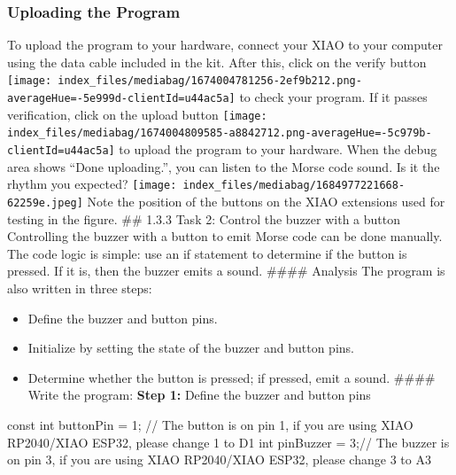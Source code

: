 \documentclass[
  letterpaper,
  DIV=11,
  numbers=noendperiod]{scrreprt}
\newenvironment{Shaded}{\begin{snugshade}}{\end{snugshade}}
\newcommand{\AttributeTok}[1]{\textcolor[rgb]{0.40,0.45,0.13}{#1}}
\newcommand{\CommentTok}[1]{\textcolor[rgb]{0.37,0.37,0.37}{#1}}
\newcommand{\DataTypeTok}[1]{\textcolor[rgb]{0.68,0.00,0.00}{#1}}
\newcommand{\DecValTok}[1]{\textcolor[rgb]{0.68,0.00,0.00}{#1}}
\newcommand{\NormalTok}[1]{\textcolor[rgb]{0.00,0.23,0.31}{#1}}
\newcommand{\OperatorTok}[1]{\textcolor[rgb]{0.37,0.37,0.37}{#1}}
\providecommand{\tightlist}{%
  \setlength{\itemsep}{0pt}\setlength{\parskip}{0pt}}\usepackage{longtable,booktabs,array}
\begin{document}
\hypertarget{uploading-the-program-1}{%
\subsubsection*{Uploading the Program}\label{uploading-the-program-1}}

To upload the program to your hardware, connect your XIAO to your
computer using the data cable included in the kit. After this, click on
the verify button
\texttt{[image: index\_files/mediabag/1674004781256-2ef9b212.png-averageHue=-5e999d-clientId=u44ac5a]}
to check your program. If it passes verification, click on the upload
button
\texttt{[image: index\_files/mediabag/1674004809585-a8842712.png-averageHue=-5c979b-clientId=u44ac5a]}
to upload the program to your hardware. When the debug area shows ``Done
uploading.'', you can listen to the Morse code sound. Is it the rhythm
you expected?
\texttt{[image: index\_files/mediabag/1684977221668-62259e.jpeg]} Note
the position of the buttons on the XIAO extensions used for testing in
the figure. \#\# 1.3.3 Task 2: Control the buzzer with a button
Controlling the buzzer with a button to emit Morse code can be done
manually. The code logic is simple: use an if statement to determine if
the button is pressed. If it is, then the buzzer emits a sound. \#\#\#\#
Analysis The program is also written in three steps:

\begin{itemize}
\tightlist
\item
  Define the buzzer and button pins.
\item
  Initialize by setting the state of the buzzer and button pins.
\item
  Determine whether the button is pressed; if pressed, emit a sound.
  \#\#\#\# Write the program: \textbf{Step 1:} Define the buzzer and
  button pins
\end{itemize}

\begin{Shaded}
\begin{Highlighting}[]
\AttributeTok{const} \DataTypeTok{int}\NormalTok{ buttonPin }\OperatorTok{=} \DecValTok{1}\OperatorTok{;} \CommentTok{// The button is on pin 1, if you are using XIAO RP2040/XIAO ESP32, please change 1 to D1}
\DataTypeTok{int}\NormalTok{ pinBuzzer }\OperatorTok{=} \DecValTok{3}\OperatorTok{;}\CommentTok{// The buzzer is on pin 3, if you are using XIAO RP2040/XIAO ESP32, please change 3 to A3}
\end{Highlighting}
\end{Shaded}
\end{document}
